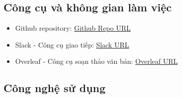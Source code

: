 \documentclass[a4paper, 12pt]{article}
\begin{document}
\subsection{Công cụ và không gian làm việc}
\begin{itemize}
    \item Github repository:
    \href{https://github.com/UIT-24730009/SnakeGame}{Github Repo URL}
    \item Slack - Công cụ giao tiếp:
    \href{https://app.slack.com/client/T07Q56DLLUX/C07U74U2XGF}{Slack URL}
    \item Overleaf - Công cụ soạn thảo văn bản:
    \href{https://www.overleaf.com/project/67271c85e33c6e0dfe041c9d}{Overleaf URL}
\end{itemize}

\subsection{Công nghệ sử dụng}
\end{document}
